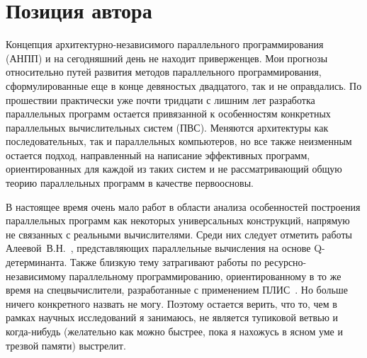 \section*{Позиция автора}
\label{intro:author}

Концепция архитектурно-независимого параллельного программирования (АНПП) и на сегодняшний день не находит приверженцев. Мои прогнозы относительно путей развития методов параллельного программирования, сформулированные еще в конце девяностых двадцатого, так и не оправдались. По прошествии практически уже почти тридцати с лишним лет разработка параллельных программ остается привязанной к особенностям конкретных параллельных вычислительных систем (ПВС). Меняются архитектуры как последовательных, так и параллельных компьютеров, но все также неизменным остается подход, направленный на написание эффективных программ, ориентированных для каждой из таких систем и не рассматривающий общую теорию параллельных программ в качестве первоосновы.

В настоящее время очень мало работ в области анализа особенностей построения параллельных программ как некоторых универсальных конструкций, напрямую не связанных с реальными вычислителями. Среди них следует отметить работы Алеевой~В.Н.~\cite{aleeva-pct-2019}, представляющих параллельные вычисления на основе Q-детерминанта. Также близкую тему затрагивают работы по ресурсно-независимому параллельному программированию, ориентированному в то же время на спецвычислители, разработанные с применением ПЛИС~\cite{levin-pct-2018}. Но больше ничего конкретного назвать не могу. Поэтому остается верить, что то, чем в рамках научных исследований я занимаюсь, не является тупиковой ветвью и когда-нибудь (желательно как можно быстрее, пока я нахожусь в ясном уме и трезвой памяти) выстрелит.


